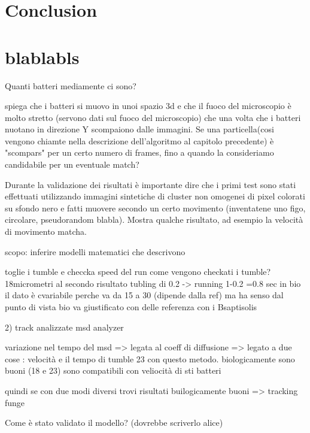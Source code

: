 \documentclass[conference]{IEEEtran}
\begin{document}
\section{Conclusion}

\section{blablabls}
Quanti batteri mediamente ci sono? 


spiega che i batteri si muovo in unoi spazio 3d e che il fuoco del microscopio è molto stretto (servono dati sul fuoco del microscopio)  che una volta che i batteri nuotano in direzione Y scompaiono dalle immagini. 
Se una particella(cosi vengono chiamte nella descrizione dell'algoritmo al capitolo precedente) è "scompars" per un certo numero di frames, fino a quando la consideriamo candidabile per un eventuale match?

Durante la validazione dei risultati è importante dire che i primi test sono stati effettuati utilizzando immagini  sintetiche di cluster non omogenei di pixel colorati su sfondo nero e fatti muovere secondo un certo movimento  (inventatene uno figo, circolare, pseudorandom blabla). 
Mostra qualche risultato, ad esempio la velocità di movimento matcha. 

scopo: inferire modelli matematici che descrivono 

toglie i tumble e checcka speed del run
come vengono checkati i tumble?
18micrometri al secondo risultato
tubling di 0.2 -> running 1-0.2 =0.8 sec
in bio il dato è cvariabile perche va da 15 a 30 (dipende dalla ref) ma ha senso dal punto di vista bio
va giustificato con delle referenza con i Bsaptisolis

2) track analizzate msd analyzer

variazione nel tempo del msd => legata al coeff di diffusione
 => legato a due cose : velocità e il tempo di tumble
 23 con questo metodo. biologicamente sono buoni (18 e 23) sono compatibili con veliocità di sti batteri
 
quindi se con due modi diversi trovi risultati builogicamente buoni => tracking funge




Come è stato validato il modello? (dovrebbe scriverlo alice)
\end{document}
